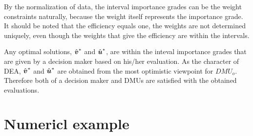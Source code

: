 By the normalization of data, the interval importance grades can be the weight constraints naturally, because the weight itself represents the importance grade. 
It should be noted that the efficiency equals one, the weights are not determined uniquely, even though the weights that give the efficiency are within the intervals. 

Any optimal solutions, $\hat{\mbox{\boldmath$v$}}^*$ and $\hat{\mbox{\boldmath$u$}}^*$, are within the inteval importance grades that are given by a decision maker based on his/her evaluation.  
As the character of DEA, $\hat{\mbox{\boldmath$v$}}^*$ and $\hat{\mbox{\boldmath$u$}}^*$ are obtained from the most optimistic viewpoint for $DMU_o$. 
Therefore both of a decision maker and DMUs are satisfied with the obtained evaluations. 

\section{Numericl example}

